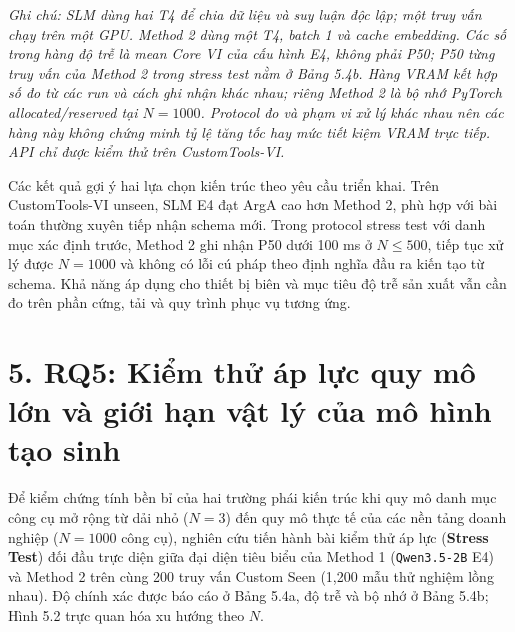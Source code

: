 \textit{Ghi chú: SLM dùng hai T4 để chia dữ liệu và suy luận độc lập; một truy vấn chạy trên một GPU. Method 2 dùng một T4, batch 1 và cache embedding. Các số trong hàng độ trễ là mean Core VI của cấu hình E4, không phải P50; P50 từng truy vấn của Method 2 trong stress test nằm ở Bảng 5.4b. Hàng VRAM kết hợp số đo từ các run và cách ghi nhận khác nhau; riêng Method 2 là bộ nhớ PyTorch allocated/reserved tại $N=1000$. Protocol đo và phạm vi xử lý khác nhau nên các hàng này không chứng minh tỷ lệ tăng tốc hay mức tiết kiệm VRAM trực tiếp. API chỉ được kiểm thử trên CustomTools-VI.}

Các kết quả gợi ý hai lựa chọn kiến trúc theo yêu cầu triển khai. Trên CustomTools-VI unseen, SLM E4 đạt ArgA cao hơn Method 2, phù hợp với bài toán thường xuyên tiếp nhận schema mới. Trong protocol stress test với danh mục xác định trước, Method 2 ghi nhận P50 dưới 100 ms ở $N \le 500$, tiếp tục xử lý được $N=1000$ và không có lỗi cú pháp theo định nghĩa đầu ra kiến tạo từ schema. Khả năng áp dụng cho thiết bị biên và mục tiêu độ trễ sản xuất vẫn cần đo trên phần cứng, tải và quy trình phục vụ tương ứng.

\section{5. RQ5: Kiểm thử áp lực quy mô lớn và giới hạn vật lý của mô hình tạo sinh}

Để kiểm chứng tính bền bỉ của hai trường phái kiến trúc khi quy mô danh mục công cụ mở rộng từ dải nhỏ ($N = 3$) đến quy mô thực tế của các nền tảng doanh nghiệp ($N = 1000$ công cụ), nghiên cứu tiến hành bài kiểm thử áp lực (\textbf{Stress Test}) đối đầu trực diện giữa đại diện tiêu biểu của Method 1 (\texttt{Qwen3.5-2B} E4) và Method 2 trên cùng 200 truy vấn Custom Seen (1,200 mẫu thử nghiệm lồng nhau). Độ chính xác được báo cáo ở Bảng 5.4a, độ trễ và bộ nhớ ở Bảng 5.4b; Hình 5.2 trực quan hóa xu hướng theo $N$.


